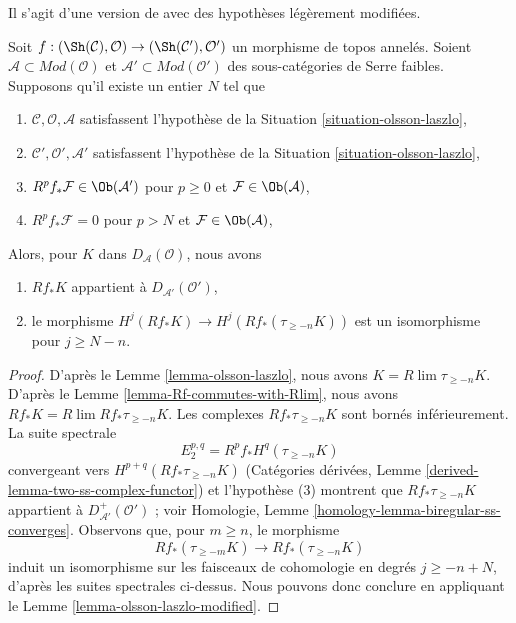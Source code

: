 \begin{lemma}
\label{lemma-olsson-laszlo-map-version-one}
\begin{reference}
Il s'agit d'une version de \cite[Lemma 2.1.10]{six-I} avec des hypothèses
légèrement modifiées.
\end{reference}
Soit $f : (\Sh(\mathcal{C}), \mathcal{O}) \to (\Sh(\mathcal{C}'), \mathcal{O}')$
un morphisme de topos annelés. Soient
$\mathcal{A} \subset \textit{Mod}(\mathcal{O})$ et
$\mathcal{A}' \subset \textit{Mod}(\mathcal{O}')$ des sous-catégories de
Serre faibles. Supposons qu'il existe un entier $N$ tel que
\begin{enumerate}
\item $\mathcal{C}, \mathcal{O}, \mathcal{A}$ satisfassent l'hypothèse de
la Situation \ref{situation-olsson-laszlo},
\item $\mathcal{C}', \mathcal{O}', \mathcal{A}'$ satisfassent l'hypothèse
de la Situation \ref{situation-olsson-laszlo},
\item $R^pf_*\mathcal{F} \in \Ob(\mathcal{A}')$ pour
$p \geq 0$ et $\mathcal{F} \in \Ob(\mathcal{A})$,
\item $R^pf_*\mathcal{F} = 0$ pour
$p > N$ et $\mathcal{F} \in \Ob(\mathcal{A})$,
\end{enumerate}
Alors, pour $K$ dans $D_\mathcal{A}(\mathcal{O})$, nous avons
\begin{enumerate}
\item[(a)] $Rf_*K$ appartient à $D_{\mathcal{A}'}(\mathcal{O}')$,
\item[(b)] le morphisme
$H^j(Rf_*K) \to H^j(Rf_*(\tau_{\geq -n}K))$ est un isomorphisme pour
$j \geq N - n$.
\end{enumerate}
\end{lemma}

\begin{proof}
D'après le Lemme \ref{lemma-olsson-laszlo}, nous avons
$K = R\lim \tau_{\geq -n}K$. D'après le Lemme
\ref{lemma-Rf-commutes-with-Rlim}, nous avons
$Rf_*K = R\lim Rf_*\tau_{\geq -n}K$. Les complexes
$Rf_*\tau_{\geq -n}K$ sont bornés inférieurement. La suite spectrale
$$
E_2^{p, q} = R^pf_*H^q(\tau_{\geq -n}K)
$$
convergeant vers $H^{p + q}(Rf_*\tau_{\geq -n}K)$ (Catégories dérivées,
Lemme \ref{derived-lemma-two-ss-complex-functor}) et l'hypothèse (3)
montrent que $Rf_*\tau_{\geq -n}K$ appartient à
$D^+_{\mathcal{A}'}(\mathcal{O}')$ ; voir Homologie, Lemme
\ref{homology-lemma-biregular-ss-converges}. Observons que, pour
$m \geq n$, le morphisme
$$
Rf_*(\tau_{\geq -m}K) \longrightarrow Rf_*(\tau_{\geq -n}K)
$$
induit un isomorphisme sur les faisceaux de cohomologie en degrés
$j \geq -n + N$, d'après les suites spectrales ci-dessus. Nous pouvons
donc conclure en appliquant le Lemme
\ref{lemma-olsson-laszlo-modified}.
\end{proof}

